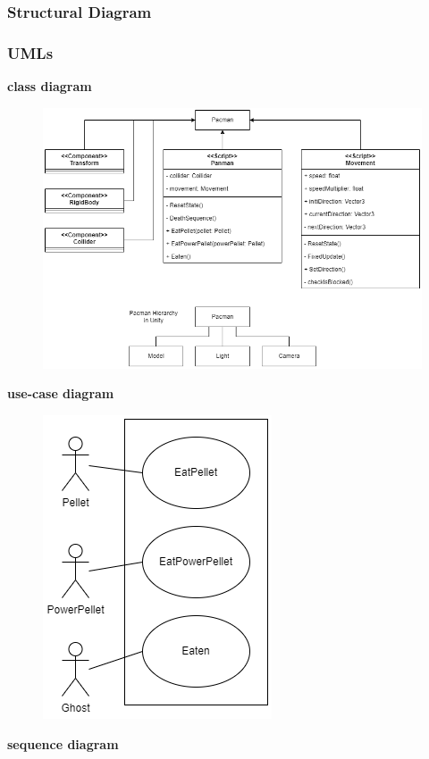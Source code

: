 \documentclass[11pt]{article}
\begin{document}
\subsubsection{Structural Diagram}
\subsubsection{UMLs}
\textbf{class diagram}\\
\begin{figure}[H]
    \centering
    \includegraphics*[scale=0.4]{Pacman_Class.png}
\end{figure}
\textbf{use-case diagram}\\
\begin{figure}[H]
    \centering
    \includegraphics*[scale=0.4]{Pacman_use-case.png}
\end{figure}
\textbf{sequence diagram}
\end{document}
